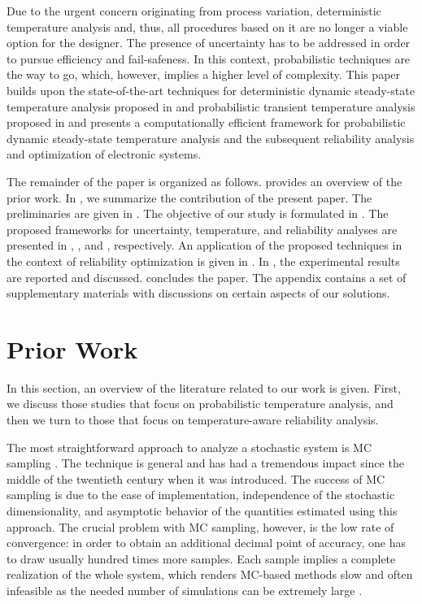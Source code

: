 Due to the urgent concern originating from process variation, deterministic
temperature analysis and, thus, all procedures based on it are no longer a
viable option for the designer. The presence of uncertainty has to be addressed
in order to pursue efficiency and fail-safeness. In this context, probabilistic
techniques are the way to go, which, however, implies a higher level of
complexity. This paper builds upon the state-of-the-art techniques for
deterministic dynamic steady-state temperature analysis proposed in
\cite{ukhov2012} and probabilistic transient temperature analysis proposed in
\cite{ukhov2014b} and presents a computationally efficient framework for
probabilistic dynamic steady-state temperature analysis and the subsequent
reliability analysis and optimization of electronic systems.

The remainder of the paper is organized as follows.  provides an
overview of the prior work. In , we summarize the contribution of the
present paper. The preliminaries are given in . The objective of our
study is formulated in . The proposed frameworks for uncertainty,
temperature, and reliability analyses are presented in , ,
and , respectively. An application of the proposed techniques in the
context of reliability optimization is given in . In , the
experimental results are reported and discussed.  concludes the paper.
The appendix contains a set of supplementary materials with discussions on
certain aspects of our solutions.

\section{Prior Work}

In this section, an overview of the literature related to our work is given.
First, we discuss those studies that focus on probabilistic temperature
analysis, and then we turn to those that focus on temperature-aware reliability
analysis.

The most straightforward approach to analyze a stochastic system is \acf{MC}
sampling \cite{maitre2010}. The technique is general and has had a tremendous
impact since the middle of the twentieth century when it was introduced. The
success of \ac{MC} sampling is due to the ease of implementation, independence
of the stochastic dimensionality, and asymptotic behavior of the quantities
estimated using this approach. The crucial problem with \ac{MC} sampling,
however, is the low rate of convergence: in order to obtain an additional
decimal point of accuracy, one has to draw usually hundred times more samples.
Each sample implies a complete realization of the whole system, which renders
\ac{MC}-based methods slow and often infeasible as the needed number of
simulations can be extremely large \cite{diaz-emparanza2002}.

